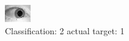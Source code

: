 \begin{figure}[h!]
\begin{center}
\includegraphics[width=0.60\columnwidth]{figures/ID1484_class_2_target_1.png}
\end{center}
\caption{ Classification: 2 actual target: 1}
\label{fig:ID1484_class_2_target_1}
\end{figure}
